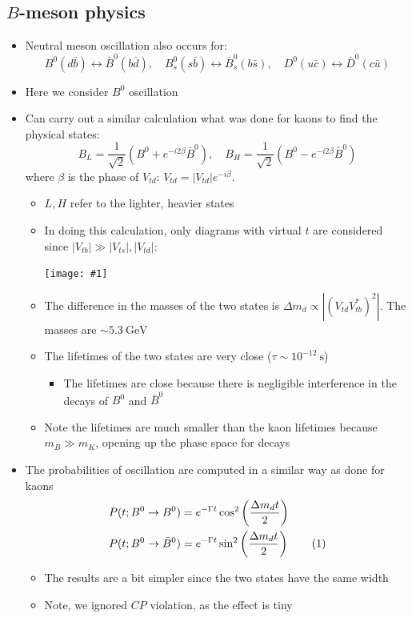 \documentclass[11pt]{article}
\newcommand\numberthis{\addtocounter{equation}{1}\tag{\theequation}}
\newcommand{\ubar}{\bar{u}}
\newcommand{\sbar}{\bar{s}}
\newcommand{\dbar}{\bar{d}}
\newcommand{\bbar}{\bar{b}}
\newcommand{\cbar}{\bar{c}}
\newcommand{\gev}{\text{GeV}}
\newcommand{\s}{\text{s}}
\newcommand{\CP}{\ensuremath{CP}\xspace}
\newcommand{\embedimgw}[2]{\begin{center}\texttt{[image: \#1]}\end{center}}
\begin{document}
\subsection{$B$-meson physics}
\begin{itemize}
  \item Neutral meson oscillation also occurs for:
  \begin{equation}
    B^0(d\bbar) \leftrightarrow \bar B^0(b\dbar), \quad B_s^0(s\bbar) \leftrightarrow \bar B_s^0(b\sbar), \quad D^0(u\cbar) \leftrightarrow \bar D^0(c\ubar) 
  \end{equation}
  \item Here we consider $B^0$ oscillation
  \item Can carry out a similar calculation what was done for kaons to find the physical states:
  \begin{equation}
    B_L = \frac{1}{\sqrt2} \left(B^0 + e^{-i2\beta} \bar B^0\right), \quad B_H = \frac{1}{\sqrt2} \left(B^0 - e^{-i2\beta} \bar B^0\right)
  \end{equation}
  where $\beta$ is the phase of $V_{td}$: $V_{td} = |V_{td}|e^{-i\beta}$.
  \begin{itemize}
    \item $L,H$ refer to the lighter, heavier states
    \item In doing this calculation, only diagrams with virtual $t$ are considered since $|V_{tb}|\gg |V_{ts}|,|V_{td}|$:
    \embedimgw{figs/Bmixing.png}{.6}
    \item The difference in the masses of the two states is $\Delta m_d \propto |(V_{td}V_{tb}^*)^2|$. The masses are $\sim 5.3~\gev$
    \item The lifetimes of the two states are very close ($\tau \sim 10^{-12}~\s$)
    \begin{itemize}
      \item The lifetimes are close because there is negligible interference in the decays of $B^0$ and $\bar B^0$
    \end{itemize}
    \item Note the lifetimes are much smaller than the kaon lifetimes because $m_B \gg m_K$, opening up the phase space for decays
  \end{itemize}
  \item The probabilities of oscillation are computed in a similar way as done for kaons
    \begin{align*}
      P(t;B^0\rightarrow B^0) &= e^{-\Gamma t}\cos^2 \left(\frac{\Delta m_d t}{2}\right)\\
      P(t;B^0\rightarrow \bar B^0) &= e^{-\Gamma t}\sin^2 \left(\frac{\Delta m_d t}{2}\right)\numberthis
    \end{align*}
  \begin{itemize}
    \item The results are a bit simpler since the two states have the same width
    \item Note, we ignored \CP violation, as the effect is tiny
  \end{itemize}
\end{itemize}
\end{document}
